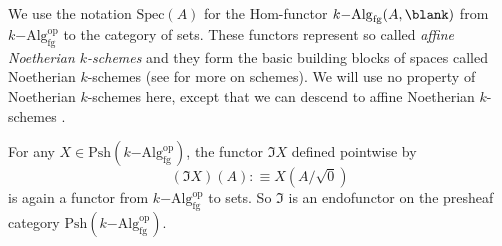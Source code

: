 \documentclass{msc}
\newcommand{\Spec}{\ensuremath{\mathrm{Spec}}}
\begin{document}
We use the notation $\Spec(A)$ for the Hom-functor $k\mathrm{-Alg}_{\mathrm{fg}}(A,\blank)$ from $k\mathrm{-Alg}^{\mathrm{op}}_{\mathrm{fg}}$ to the category of sets.
These functors represent so called \emph{affine Noetherian $k$-schemes} and they form the basic building blocks of spaces called Noetherian $k$-schemes
(see \cite[Chapter II]{hartshorne} for more on schemes).
We will use no property of Noetherian $k$-schemes here,
except that we can descend to affine Noetherian $k$-schemes .

For any $X\in\mathrm{Psh}(k\mathrm{-Alg}^\mathrm{op}_{\mathrm{fg}})$,
the functor $\Im X$ defined pointwise by
\[ (\Im X)(A):\equiv X(A/\sqrt{0})\]
is again a functor from $k\mathrm{-Alg}^\mathrm{op}_{\mathrm{fg}}$ to sets.
So $\Im$ is an endofunctor on the presheaf category $\mathrm{Psh}(k\mathrm{-Alg}^\mathrm{op}_{\mathrm{fg}})$.
\end{document}
